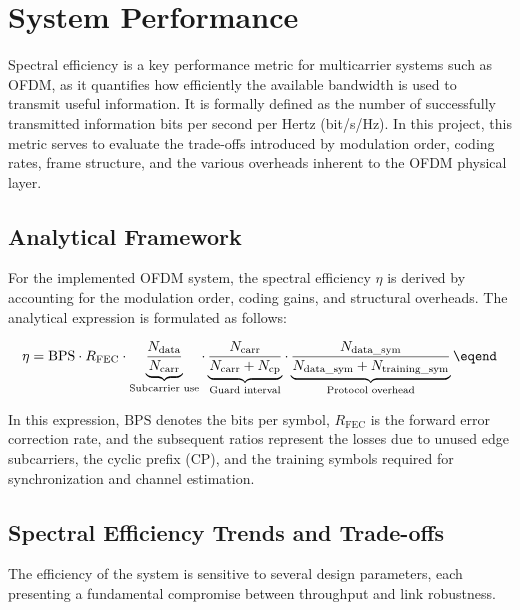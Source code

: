 \setcounter{chapter}{3}
\chapter{System Performance} \label{ch:performance}

Spectral efficiency is a key performance metric for multicarrier systems such as OFDM, as it quantifies how efficiently the available bandwidth is used to transmit useful information. It is formally defined as the number of successfully transmitted information bits per second per Hertz (bit/s/Hz). In this project, this metric serves to evaluate the trade-offs introduced by modulation order, coding rates, frame structure, and the various overheads inherent to the OFDM physical layer.

\section{Analytical Framework}

For the implemented OFDM system, the spectral efficiency $\eta$ is derived by accounting for the modulation order, coding gains, and structural overheads. The analytical expression is formulated as follows:

\begin{equation} \label{eq:spectral_efficiency_full}
    \eta = \mathrm{BPS} \cdot R_{\mathrm{FEC}} \cdot \underbrace{\frac{N_{\mathrm{data}}}{N_{\mathrm{carr}}}}_{\text{Subcarrier use}} \cdot \underbrace{\frac{N_{\mathrm{carr}}}{N_{\mathrm{carr}} + N_{\mathrm{cp}}}}_{\text{Guard interval}} \cdot \underbrace{\frac{N_{\mathrm{data\_sym}}}{N_{\mathrm{data\_sym}} + N_{\mathrm{training\_sym}}}}_{\text{Protocol overhead}} \eqend
\end{equation}

In this expression, $\mathrm{BPS}$ denotes the bits per symbol, $R_{\mathrm{FEC}}$ is the forward error correction rate, and the subsequent ratios represent the losses due to unused edge subcarriers, the cyclic prefix (CP), and the training symbols required for synchronization and channel estimation.

\section{Spectral Efficiency Trends and Trade-offs}

The efficiency of the system is sensitive to several design parameters, each presenting a fundamental compromise between throughput and link robustness.

